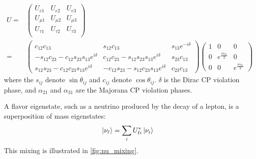 \documentclass[herrin-thesis.tex]{subfiles}
\begin{document}
\begin{align}
U =&\begin{pmatrix}
	U_{e1}	&	U_{e2}	& 	U_{e3}	\\
	U_{\mu1}	&	U_{\mu2}	& 	U_{\mu3}	\\
	U_{\tau1}	&	U_{\tau2}	& 	U_{\tau3}	\\
	\end{pmatrix}\\
	=&\begin{pmatrix}
	c_{12}c_{13}							&	s_{12}c_{13}							&	s_{13}e^{-i\delta}	\\
	-s_{12}c_{23}-c_{12}s_{23}s_{13}e^{i\delta}	&	c_{12}c_{23}-s_{12}s_{23}s_{13}e^{i\delta}	&	s_{23}c_{13}		\\
	s_{12}s_{23}-c_{12}c_{23}s_{13}e^{i\delta}	&	-c_{12}s_{23}-s_{12}c_{23}s_{13}e^{i\delta}	&	c_{23}c_{13}
	\end{pmatrix}
	\begin{pmatrix}
	1	&	0					&	0	\\
	0	&	e^{\frac{i\alpha_{21}}{2}}	&	0	\\
	0	&	0					&	e^{\frac{i\alpha_{31}}{2}}
	\end{pmatrix}\nonumber
\label{eq:nu_pmns_matrix}
\end{align}
where the \(s_{ij}\) denote \(\sin\theta_{ij}\) and \(c_{ij}\) denote \(\cos\theta_{ij}\). \(\delta\) is the Dirac CP violation phase, and \(\alpha_{21}\) and \(\alpha_{31}\) are the Majorana CP violation phases.

 A flavor eigenstate, such as a neutrino produced by the decay of a lepton, is a superposition of mass eigenstates:
 \begin{equation}
 \Ket{\nu_{\ell}} = \sum_{i}U_{\ell i}^{*} \Ket{\nu_i}
 \label{eq:nu_superposition}
 \end{equation}
 This mixing is illustrated in \cref{fig:nu_mixing}.
 
\end{document}
